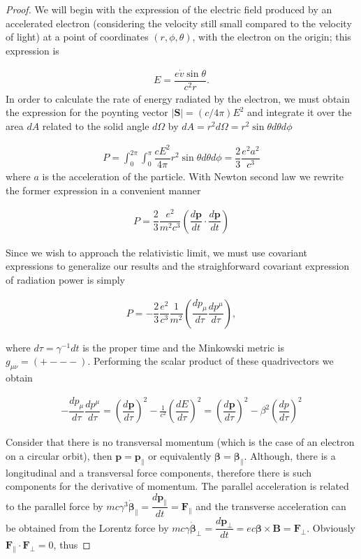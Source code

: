 \documentclass[../sands-adaptation.tex]{subfiles}
\begin{document}
\begin{proof}
We will begin with the expression of the electric field produced by an accelerated electron (considering the velocity still small compared to the velocity of light) at a point of coordinates $(r,\phi,\theta)$, with the electron on the origin; this expression is

\begin{align*}
E = \dfrac{e\dot{v}\sin \theta}{c^2 r}.
\end{align*}
In order to calculate the rate of energy radiated by the electron, we must obtain the expression for the poynting vector $|\mathbf{S}| = (c/4\pi)E^2$ and integrate it over the area $dA$ related to the solid angle $d\Omega$ by $dA = r^2d\Omega = r^2\sin\theta d\theta d\phi$

\begin{align*}
P = \int_{0}^{2\pi}\int_{0}^{\pi}\dfrac{cE^2}{4\pi}r^2\sin\theta d\theta d\phi = \dfrac{2}{3}\dfrac{e^2a^{2}}{c^3}
\end{align*}
where $a$ is the acceleration of the particle. With Newton second law we rewrite the former expression in a convenient manner

\begin{align*}
P = \dfrac{2}{3}\dfrac{e^2}{m^2c^3} \left(\dfrac{d\mathbf{p}}{dt}\cdot\dfrac{d\mathbf{p}}{dt}\right)
\end{align*}

Since we wish to approach the relativistic limit, we must use covariant expressions to generalize our results and the straighforward covariant expression of radiation power is simply

\begin{align*}
P = -\dfrac{2}{3}\dfrac{e^2}{c^3} \dfrac{1}{m^2} \left(\dfrac{d{p_\mu}}{d\tau}\dfrac{dp^\mu}{d\tau}\right),
\end{align*}

where $d\tau = \gamma^{-1}dt$ is the proper time and the Minkowski metric is $g_{\mu \nu} = (+ - - -)$. Performing the scalar product of these quadrivectors we obtain

\begin{align*}
-\dfrac{d{p_\mu}}{d\tau}\dfrac{dp^\mu}{d\tau} = \left(\dfrac{d\mathbf{p}}{d\tau}\right)^2 - \frac{1}{c^2}\left(\dfrac{dE}{d\tau}\right)^2 = \left(\dfrac{d\mathbf{p}}{d\tau}\right)^2 - \beta^2\left(\dfrac{dp}{d\tau}\right)^2
\end{align*}

Consider that there is no transversal momentum (which is the case of an electron on a circular orbit), then $\boldsymbol{{p}} = \boldsymbol{p}_\parallel$ or equivalently $\boldsymbol{\beta} = \boldsymbol{\beta_\parallel}$. Although, there is a longitudinal and a transversal force components, therefore
 there is such components for the derivative of momentum. The parallel acceleration is related to the parallel force by $mc\gamma^3\boldsymbol{\dot{\beta}}_\parallel = \dfrac{d\mathbf{p}_\parallel}{dt} = \mathbf{F}_\parallel$ and the transverse acceleration can be obtained from the Lorentz force by
 $mc \gamma\boldsymbol{\dot{\beta}}_\perp = \dfrac{d\boldsymbol{p}_{\perp}}{dt} = ec\boldsymbol{{\beta}} \times \mathbf{B} = \mathbf{F}_\perp$. Obviously $\mathbf{F}_\parallel \cdot \mathbf{F}_\perp = 0$, thus


\end{proof}
\end{document}
